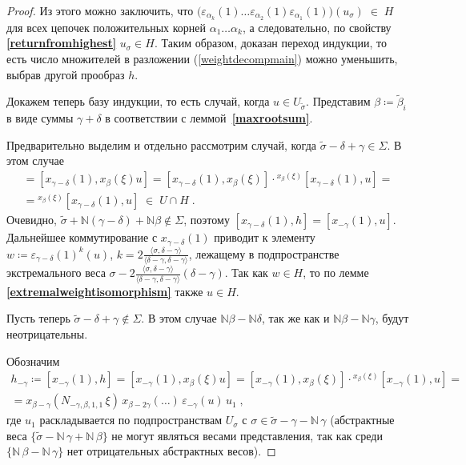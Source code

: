 \documentclass[12pt]{matmex-diploma}
\theoremstyle{mystyleni}
\theoremstyle{mystyle}
\newcommand\refb[1]{\textbf{\ref{#1}}}
\newcommand{\N}{\mathbb{N}}
\begin{document}
\begin{proof}
Из этого можно заключить, что $\big(\varepsilon_{\alpha_k}(1)\ldots\varepsilon_{\alpha_2}(1)\varepsilon_{\alpha_1}(1)\big)(u_\sigma) \; \in \; H$ для всех цепочек положительных корней $\alpha_1\ldots\alpha_k$, а следовательно, по свойству \refb{returnfromhighest} $u_\sigma \in H$. Таким образом, доказан переход индукции, то есть число множителей в разложении (\ref{weightdecompmain}) можно уменьшить, выбрав другой прообраз $h$.

Докажем теперь базу индукции, то есть случай, когда $u \in  U_{\widetilde\sigma}$.
Представим $\beta\coloneqq\widetilde\beta_i$ в виде суммы $\gamma+\delta$ в соответствии с леммой~\refb{maxrootsum}.

\pagebreak


Предварительно выделим и отдельно рассмотрим случай, когда $\widetilde\sigma-\delta+\gamma \in \Sigma$. В этом случае
\begin{multline*}
[x_{\gamma-\delta}(1),h] = [x_{\gamma-\delta}(1),x_\beta(\xi)u] = [x_{\gamma-\delta}(1),x_\beta(\xi)] \cdot {}^{x_\beta(\xi)}[x_{\gamma-\delta}(1),u] =\\=
{}^{x_\beta(\xi)}[x_{\gamma-\delta}(1),u] \;\in\; U\cap H \;.
\end{multline*}
Очевидно, $\widetilde\sigma + \N(\gamma-\delta)+\N\beta \notin \Sigma$, поэтому
$[x_{\gamma-\delta}(1),h] = [x_{-\gamma}(1),u]$. Дальнейшее коммутирование с $x_{\gamma-\delta}(1)$ приводит к элементу $w\coloneqq\varepsilon_{\gamma-\delta}(1)^k(u)$, $k=2\frac{\langle\sigma,\delta-\gamma\rangle}{\langle\delta-\gamma,\delta-\gamma\rangle}$, лежащему в подпространстве экстремального веса $\sigma-2\frac{\langle\sigma,\delta-\gamma\rangle}{\langle\delta-\gamma,\delta-\gamma\rangle}(\delta-\gamma)$. Так как $w\in H$, то по лемме \refb{extremalweightisomorphism} также $u \in H$.

Пусть теперь $\widetilde\sigma-\delta+\gamma \notin \Sigma$. В этом случае $\N\beta-\N\delta$, так же как и $\N\beta-\N\gamma$, будут неотрицательны.

Обозначим
\begin{multline*}
h_{-\gamma} \coloneqq [x_{-\gamma}(1),h] = [x_{-\gamma}(1),x_\beta(\xi) u] = [x_{-\gamma}(1),x_\beta(\xi)] \cdot {}^{x_\beta(\xi)}[x_{-\gamma}(1),u] = \\ =
x_{\beta-\gamma}(N_{-\gamma,\beta,1,1} \,\xi) \, x_{\beta-2\gamma}(\ldots) \, \varepsilon_{-\gamma}(u) \, u_1 \; ,
\end{multline*}
где $u_1$ раскладывается по подпространствам $U_\sigma$ с $\sigma \in \widetilde\sigma-\gamma - \N \, \gamma$ (абстрактные веса $\{\widetilde\sigma-\N\,\gamma+\N\,\beta\}$ не могут являться весами представления, так как среди $\{\N\,\beta-\N\,\gamma\}$ нет отрицательных абстрактных весов).


\end{proof}
\end{document}
